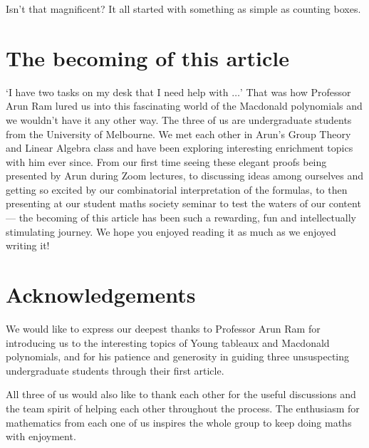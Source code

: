 \documentclass[a4paper,11pt]{amsart}
\begin{document}
		Isn't that magnificent? It all started with something as simple as counting boxes.
		
		\nocite{*}
\section{The becoming of this article}
    	`I have two tasks on my desk that I need help with $\ldots$' That was how Professor Arun Ram lured us into this fascinating world of the Macdonald polynomials and we wouldn't have it any other way. The three of us are undergraduate students from the University of Melbourne. We met each other in Arun's Group Theory and Linear Algebra class and have been exploring interesting enrichment topics with him ever since. From our first time seeing these elegant proofs being presented by Arun during Zoom lectures, to discussing ideas among ourselves and getting so excited by our combinatorial interpretation of the formulas, to then presenting at our student maths society seminar to test the waters of our content --- the becoming of this article has been such a rewarding, fun and intellectually stimulating journey. We hope you enjoyed reading it as much as we enjoyed writing it!
    	
\section{Acknowledgements}
        We would like to express our deepest thanks to Professor Arun Ram for introducing us to the interesting topics of Young tableaux and Macdonald polynomials,  and for his patience and generosity in guiding three unsuspecting undergraduate students through their first article.%
        
        All three of us would also like to thank each other for the useful discussions and the team spirit of helping each other throughout the process. The enthusiasm for mathematics from each one of us inspires the whole group to keep doing maths with enjoyment. 
		\printbibliography
\end{document}
